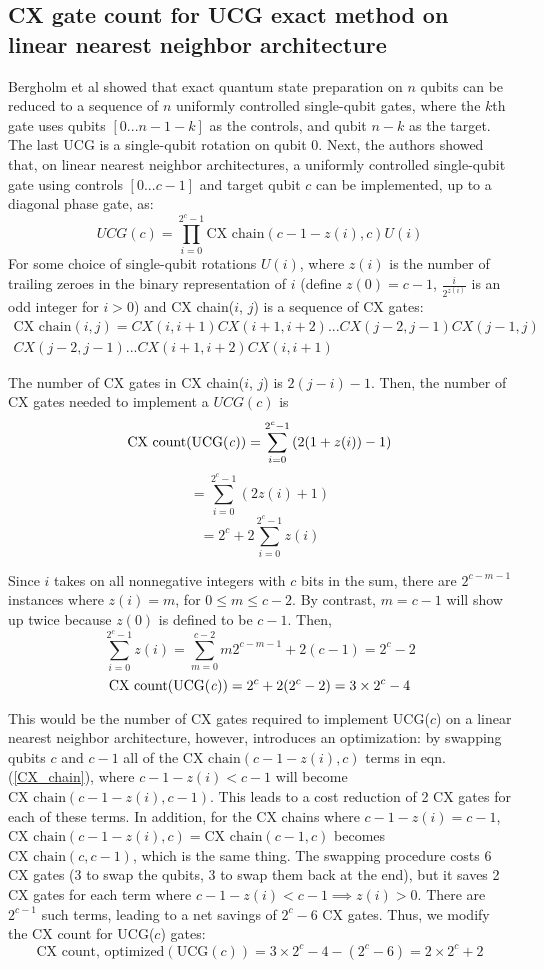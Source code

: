 \documentclass{article}
\begin{document}
\subsection{CX gate count for UCG exact method on linear nearest neighbor 
architecture}
Bergholm et al \cite{bergholm2005quantum} showed that exact quantum 
state preparation on $n$ qubits
can be reduced to a sequence of $n$ uniformly controlled single-qubit gates,
where the $k$th gate uses qubits $[0 ... n - 1 - k]$ as the controls, and qubit
$n - k$ as the target. The last UCG is a single-qubit rotation on qubit 0. 
Next, the authors showed that, on linear nearest neighbor architectures,
a uniformly controlled single-qubit gate using controls $[0 ... c - 1]$ and 
target qubit $c$ can be implemented, up to a diagonal phase gate, as:
$$UCG(c) = \prod_{i=0}^{2^c - 1}{\text{CX chain}(c - 1 - z(i), c)U(i)}$$
For some choice of single-qubit rotations $U(i)$, where $z(i)$ is the number
of trailing zeroes in the binary representation of $i$ (define $z(0) = c - 1$,
$\frac{i}{2^{z(i)}}$ is an odd integer for $i > 0$)
and CX chain($i$, $j$) is a sequence of CX gates:
\begin{multline} \label{CX_chain}
\text{CX chain}(i, j) = CX(i, i + 1) CX(i + 1, i + 2) ... CX(j - 2, j - 1)
  CX(j - 1, j)\\
  CX(j - 2, j - 1) ... CX(i + 1, i + 2)CX(i, i + 1)
\end{multline}

The number of CX gates in CX chain($i$, $j$) is $2(j - i) - 1$. Then, the
number of CX gates needed to implement a $UCG(c)$ is
$$\text{CX count(UCG(\textit{c}))} = \sum_{i=0}^{2^c - 1}{(2(1 + z(i)) - 1)}$$
$$ = \sum_{i=0}^{2^c - 1}{(2z(i) + 1)}$$
$$ = 2^c + 2\sum_{i=0}^{2^c - 1}{z(i)}$$

Since $i$ takes on all nonnegative integers with $c$ bits in the sum, there 
are $2^{c-m-1}$ instances where $z(i) = m$, for $0 \leq m \leq c - 2$.
By contrast, $m = c - 1$ will show up twice because $z(0)$ is defined to be 
$c - 1$. Then,
$$\sum_{i=0}^{2^c - 1}{z(i)} = \sum_{m=0}^{c - 2}{m2^{c-m-1}} + 2(c - 1) = 2^c - 2$$
$$\text{CX count(UCG(\textit{c}))} = 2^c + 2(2^c - 2) = 3 \times 2^c - 4$$

This would be the number of CX gates required to implement UCG($c$) on a linear
nearest neighbor architecture, however, \cite{bergholm2005quantum} introduces
an optimization: by swapping qubits $c$ and $c - 1$ all of the 
$\text{CX chain}(c - 1 - z(i), c)$ terms in eqn. (\ref{CX_chain}), where
$c - 1 - z(i) < c - 1$ will become $\text{CX chain}(c - 1 - z(i), c - 1)$. This
leads to a cost reduction of 2 CX gates for each of these terms. In addition,
for the CX chains where $c - 1 - z(i) = c - 1$, 
$\text{CX chain}(c - 1 - z(i), c) = \text{CX chain}(c - 1, c)$ becomes
$\text{CX chain}(c, c - 1)$, which is the same thing. The swapping procedure
costs 6 CX gates (3 to swap the qubits, 3 to swap them back at the end), but it
saves 2 CX gates for each term where $c - 1 - z(i) < c - 1 \implies z(i) > 0$.
There are $2^{c - 1}$ such terms, leading to a net savings of $2^c - 6$ CX
gates. Thus, we modify the CX count for UCG($c$) gates:
$$\text{CX count, optimized}(\text{UCG}(c)) 
= 3\times2^c - 4 - (2^c - 6) = 2 \times 2^c + 2$$
\end{document}

